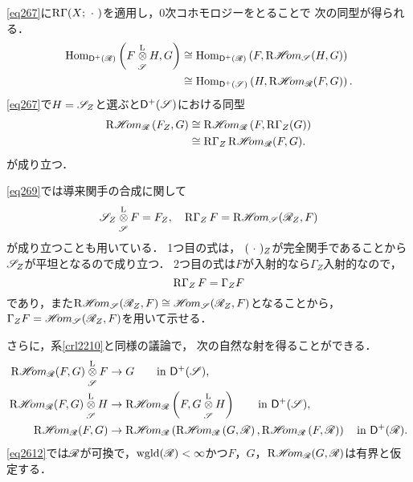 \eqref{eq267}に\(\RG(X;\blk)\)を適用し，0次コホモロジーをとることで
次の同型が得られる．
\begin{align}
    \Hom_{\Dompl(\scR)}\left(F\lltens[\scS]H,G\right)
    &\cong
    \Hom_{\Dompl(\scR)}\left(F,\RHOM_{\scS}(H,G)\right)\label{eq268}\\
    &\cong
    \Hom_{\Dompl(\scS)}\left(H,\RHOM_{\scR}(F,G)\right).\notag
\end{align}
\eqref{eq267}で\(H=\scS_Z\)と選ぶと\(\Dompl(\scS)\)における同型
\begin{align}
    \RHOM_{\scR}\left(F_Z,G\right)
    &\cong
    \RHOM_{\scR}\left(F,\RG_{Z}(G)\right)\label{eq269}\\
    &\cong
    \RG_{Z}\RHOM_{\scR}(F,G).\notag
\end{align}
が成り立つ．

\begin{CMT}
    \eqref{eq269}では導来関手の合成に関して
    \[
        \scS_Z\lltens[\scS]F=F_Z,
        \quad
        \RG_{Z}F=\RHOM_{\scS}(\scR_{Z},F)
    \]
    が成り立つことも用いている．
    1つ目の式は，
    \((\blk)_{Z}\)が完全関手であることから
    \(\scS_Z\)が平坦となるので成り立つ．
    2つ目の式は\(F\)が入射的なら\(\Gamma_{Z}\)入射的なので，
    \[
        \RG_{Z}F=\Gamma_{Z}F
    \]であり，また\(
        \RHOM_{\scS}(\scR_{Z},F)
        \cong
        \HOM_{\scS}(\scR_{Z},F)
    \)となることから，
    \(\Gamma_{Z}F=\HOM_{\scS}(\scR_{Z},F)\)を用いて示せる．
\end{CMT}

さらに，系\ref{crl2210}と同様の議論で，
次の自然な射を得ることができる．
\begin{align}
    \RHOM_{\scR}(F,G)\lltens[\scS]F
    &\to G\qquad\text{in \(\Dompl(\scS)\),}\label{eq2610}\\
    \RHOM_{\scR}(F,G)\lltens[\scS]H
    &\to \RHOM_{\scR}\left(F,G\lltens[\scS]H\right) 
    \qquad\text{in \(\Dompl(\scS)\),}\label{eq2611}\\
    \RHOM_{\scR}(F,G)
    &\to 
    \RHOM_{\scR}\left(
        \RHOM_{\scR}\left(G,\scR\right),
        \RHOM_{\scR}\left(F,\scR\right)
    \right)\quad\text{in \(\Dompl(\scR)\).}\label{eq2612}
\end{align}
\eqref{eq2612}では\(\scR\)が可換で，\(\wgld(\scR)<\infty\)かつ\(F\)，\(G\)，\(\RHOM_{\scR}(G,\scR)\)は有界と仮定する．


